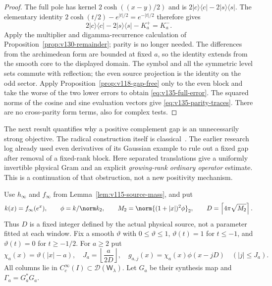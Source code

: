 \begin{proof}
The full pole has kernel $2\cosh((x-y)/2)$ and is
$2|c\rangle\langle c|-2|s\rangle\langle s|$.  The elementary
identity $2\cosh(t/2)-e^{|t|/2}=e^{-|t|/2}$ therefore gives
\[
 2|c\rangle\langle c|-2|s\rangle\langle s|-K_a^+=K_a^-.
\]
Apply the multiplier and digamma-recurrence calculation of
Proposition~\ref{prop:v130-remainder}; parity is no longer needed.
The differences from the archimedean form are bounded at fixed $a$,
so the identity extends from the smooth core to the displayed domain.
The symbol and all the symmetric level sets commute with reflection;
the even source projection is the identity on the odd sector.
Apply Proposition~\ref{prop:v118-gap-free} only to the even block and
take the worse of the two lower errors to obtain
\eqref{eq:v135-full-error}.  The squared norms of the cosine and sine
evaluation vectors give \eqref{eq:v135-parity-traces}.  There are no
cross-parity form terms, also for complex tests.
\end{proof}

The next result quantifies why a positive complement gap is an
unnecessarily strong objective.  The radical construction itself is
classical~\cite[Section 3]{ConnesConsani2023}.  The earlier research
log already used even derivatives of its Gaussian example to rule out
a fixed gap after removal of a fixed-rank block.  Here separated
translations give a uniformly invertible physical Gram and an explicit
\emph{growing-rank ordinary operator} estimate.  This is a continuation
of that obstruction, not a new positivity mechanism.

Use $h_\infty$ and $f_\infty$ from
Lemma~\ref{lem:v115-source-mass}, and put
\[
 k(x)=f_\infty(e^x),\qquad \phi=k/\norm k_2,\qquad
 M_2=\norm{(1+|x|)^2\phi}_2,\qquad
 D=\left\lceil4\pi\sqrt{M_2}\right\rceil.
\]
Thus $D$ is a fixed integer defined by the actual physical source,
not a parameter fitted at each window.  Fix a smooth $\vartheta$ with
$0\le\vartheta\le1$, $\vartheta(t)=1$ for $t\le-1$, and
$\vartheta(t)=0$ for $t\ge-1/2$.  For $a\ge2$ put
\[
 \chi_a(x)=\vartheta(|x|-a),\quad
 J_a=\left\lfloor\frac{a}{2D}\right\rfloor,\quad
 g_{a,j}(x)=\chi_a(x)\phi(x-jD)\quad(|j|\le J_a).
\]
All columns lie in $C_c^\infty(I)\subset\mathcal D(\mathsf W_\lambda)$.
Let $G_a$ be their synthesis map and $\Gamma_a=G_a^*G_a$.

